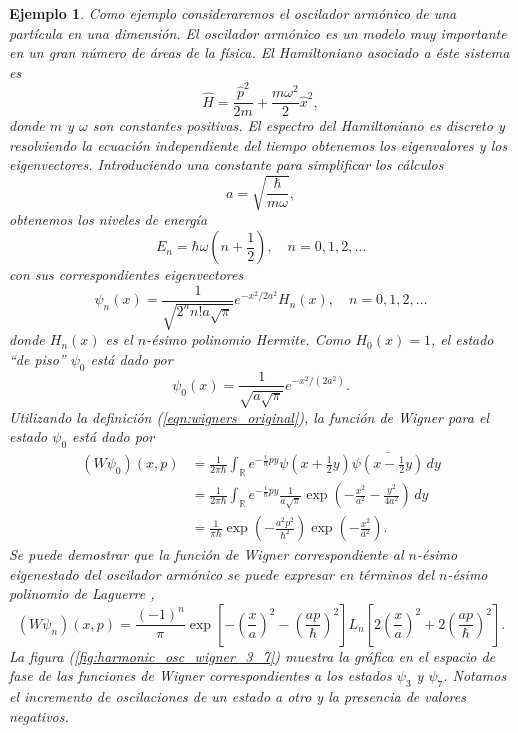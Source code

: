 \documentclass[a4paper]{report}
\DeclareMathOperator{\R}{\mathbb{R}}
\newtheorem{example}{Ejemplo}
\begin{document}
  \begin{example}
    Como ejemplo consideraremos el oscilador armónico de una
    partícula en una dimensión. El oscilador armónico es un
    modelo muy importante en un gran número de áreas de la
    física.  El Hamiltoniano asociado a éste sistema es
    \begin{equation}
      \hat{H}
      = \frac{\hat{p}^2}{2m} + \frac{m\omega^2}{2}
      \hat{x}^2,
    \end{equation}
    donde $m$ y $\omega$ son constantes positivas. El espectro
    del Hamiltoniano es discreto y resolviendo la ecuación
    independiente del tiempo obtenemos los eigenvalores y los
    eigenvectores. Introduciendo una constante para
    simplificar los cálculos
    \[
      a = \sqrt{\frac{\hbar}{m \omega}},
    \]
    obtenemos los niveles de energía
    \begin{equation}
      E_n
      = \hbar \omega \left( n + \frac{1}{2} \right),
      \quad n = 0,1,2,\ldots
    \end{equation}
    con sus correspondientes eigenvectores
    \begin{equation}
      \psi_n(x)
      = \frac{1}{\sqrt{2^{n} n! a \sqrt{\pi}}} e^{-x^2 / 2a^2}
      H_n(x),
      \quad n = 0, 1, 2,\ldots
    \end{equation}
    donde $H_n(x)$ es el $n$-ésimo polinomio Hermite.
    Como $H_0(x) = 1$, el estado ``de piso'' $\psi_0$ está
    dado por
    \[
      \psi_0(x)
      = \frac{1}{\sqrt{a \sqrt{\pi}}} e^{-x^2 / (2a^2)}.
    \]
    Utilizando la definición (\ref{eqn:wigners_original}), la
    función de Wigner para el estado $\psi_0$ está dado por
    \begin{align*}
      (W\psi_0)(x,p)
      &= \frac{1}{2\pi\hbar} \int_{\R} e^{-\frac{i}{\hbar} p y}
      \psi(x + \tfrac{1}{2}y) \overline{\psi(x -
      \tfrac{1}{2}y)} \, dy \\
      &= \frac{1}{2\pi\hbar} \int_{\R} e^{-\frac{i}{\hbar}py}
      \frac{1}{a\sqrt{\pi}}\exp\left( -\frac{x^2}{a^2} -
      \frac{y^2}{4a^2} \right)  \, dy \\
      &= \frac{1}{\pi\hbar} \exp\left( -\frac{a^2
      p^2}{\hbar^2} \right) \exp\left( -\frac{x^2}{a^2}
      \right). 
    \end{align*}
    Se puede demostrar que la función de Wigner
    correspondiente al $n$-ésimo eigenestado del oscilador
    armónico se puede expresar en términos del $n$-ésimo
    polinomio de Laguerre \cite{zachos2005}, 
    \begin{equation}
      (W\psi_n)(x,p)
      = \frac{(-1)^{n}}{\pi} \exp\left[ -\left( \frac{x}{a}
      \right)^2 - \left( \frac{ap}{\hbar} \right)^2 \right]
      L_n\left[ 2\left( \frac{x}{a} \right)^2 + 2\left(
      \frac{ap}{\hbar} \right)^2 \right].
    \end{equation} 
    La figura (\ref{fig:harmonic_osc_wigner_3_7}) muestra la
    gráfica en el espacio de fase de las funciones de Wigner
    correspondientes a los estados $\psi_3$ y $\psi_7$.
    Notamos el incremento de oscilaciones de un estado a otro
    y la presencia de valores negativos.
    

\end{example}
\end{document}
